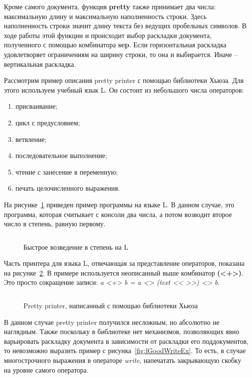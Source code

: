 \inputminted{haskell}{codes/hughesPretty.hs}

Кроме самого документа, функция \textbf{pretty} также принимает два числа: максимальную длину и максимальную наполненность строки. Здесь наполненность строки значит длину текста без ведущих пробельных символов. В ходе работы этой функции и происходит выбор раскладки документа, полученного с помощью комбинатора \textbf{sep}. Если горизонтальная раскладка удовлетворяет ограничениям на ширину строки, то она и выбирается. Иначе -- вертикальная раскладка.



Рассмотрим пример описания pretty printer с помощью библиотеки Хьюза. Для этого используем учебный язык L. Он состоит из небольшого числа операторов:
\begin{enumerate}
\item присваивание;
\item цикл с предусловием;
\item ветвление;
\item последовательное выполнение;
\item чтение с занесение в переменную;
\item печать целочисленного выражения.
\end{enumerate}

На рисунке~\ref{fig:lEx} приведен пример программы на языке L. В данном случае, это программа, которая считывает с консоли два числа, а потом возводит второе число в степень, равную первому.

\begin{figure}[h!]
	\centering
	\inputminted{pascal}{codes/lEx.l}
	\caption{Быстрое возведение в степень на L}
	\label{fig:lEx}
\end{figure}

Часть принтера для языка L, отвечающая за представление операторов, показана на рисунке~\ref{fig:lHughesPrinter}.
В примере используется неописанный выше комбинатор \textbf{(<+>)}. Это просто сокращение записи: \textit{a <+> b = a <> (text << >>) <> b}.
\begin{figure}[h!]
	\inputminted{haskell}{codes/lHughesPrinter.hs}
	\caption{Pretty printer, написанный с помощью библиотеки Хьюза}
	\label{fig:lHughesPrinter}
\end{figure}

В данном случае pretty printer получился несложным, но абсолютно не наглядным. Также поскольку в библиотеке нет механизмов, позволяющих явно варьировать раскладку документа в зависимости от раскладки его поддокументов, то невозможно выразить пример с рисунка~\ref{fig:lGoodWriteEx}.
То есть, в случае многострочного выражения в операторе \textit{write}, напечатать закрывающую скобку на уровне самого оператора.

